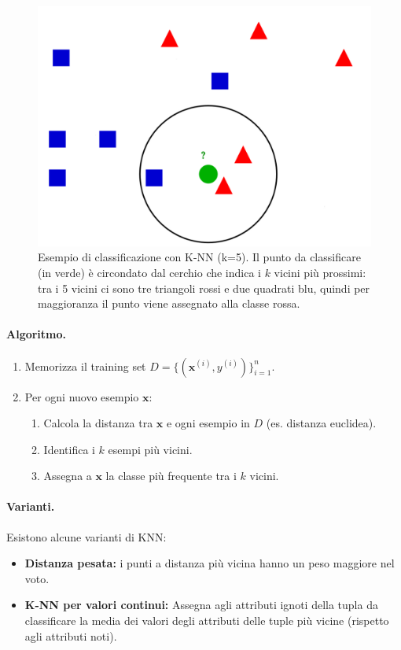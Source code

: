 \begin{figure}[htbp]
  \centering
  \includegraphics[width=.8\textwidth]{images/knn_example.png}
  \caption{Esempio di classificazione con K-NN (k=5). Il punto da classificare (in verde) è circondato dal cerchio che indica i $k$ vicini più prossimi: tra i 5 vicini ci sono tre triangoli rossi e due quadrati blu, quindi per maggioranza il punto viene assegnato alla classe rossa.}
  \label{fig:knn-example}
\end{figure}

\paragraph{Algoritmo.}
\begin{enumerate}
  \item Memorizza il training set \(D=\{(\mathbf{x}^{(i)},y^{(i)})\}_{i=1}^{n}\).
  \item Per ogni nuovo esempio \(\mathbf{x}\):
  \begin{enumerate}
    \item Calcola la distanza tra \(\mathbf{x}\) e ogni esempio in \(D\) (es. distanza euclidea).
    \item Identifica i \(k\) esempi più vicini.
    \item Assegna a \(\mathbf{x}\) la classe più frequente tra i \(k\) vicini.
  \end{enumerate}
\end{enumerate}

\paragraph{Varianti.}
Esistono alcune varianti di KNN:
\begin{itemize}
  \item \textbf{Distanza pesata:} i punti a distanza più vicina hanno un peso maggiore nel voto.
  \item \textbf{K-NN per valori continui:} Assegna agli attributi ignoti della tupla da classificare la media dei valori degli attributi delle tuple più vicine (rispetto agli attributi noti).
\end{itemize}